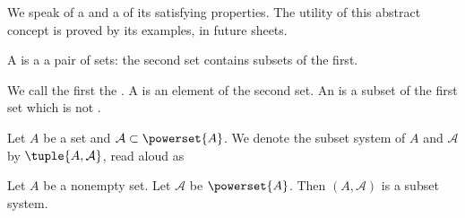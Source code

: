 
\sbasic







\sstart
{}


We speak of a
and a
of its
satisfying properties.
The utility of this
abstract concept
is proved by its examples,
in future sheets.


A
is a a pair of sets:
the second set contains
subsets of the first.

We call the first
the
.
A
is an element of the second set.
An
is a subset of the first set which is not
.



Let $A$ be a set and $\mathcal{A} \subset \powerset{A}$.
We denote the subset system of $A$ and $\mathcal{A}$
by $\tuple{A, \mathcal{A}}$, read aloud as 


\begin{expl}
Let $A$ be a nonempty set.
Let $\mathcal{A}$ be $\powerset{A}$.
Then $(A, \mathcal{A})$ is a subset system.
\end{expl}
\strats
